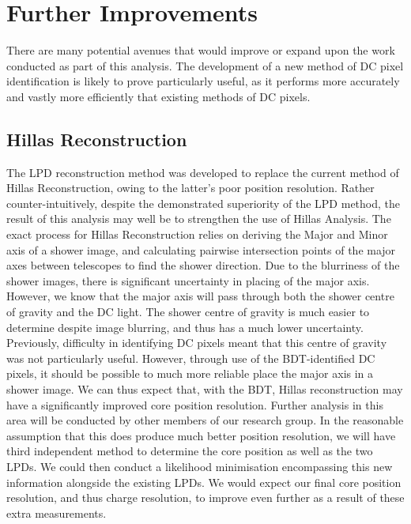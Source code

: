 \documentclass[11pt]{article}
\begin{document}
\section{Further Improvements}
There are many potential avenues that would improve or expand upon the work conducted as part of this analysis. The development of a new method of DC pixel identification is likely to prove particularly useful, as it performs more accurately and vastly more efficiently that existing methods of DC pixels.  

\subsection{Hillas Reconstruction}
The LPD reconstruction method was developed to replace the current method of Hillas Reconstruction, owing to the latter's poor position resolution. Rather counter-intuitively, despite the demonstrated superiority of the LPD method, the result of this analysis may well be to strengthen the use of Hillas Analysis. The exact process for Hillas Reconstruction relies on deriving the Major and Minor axis of a shower image, and calculating pairwise intersection points of the major axes between telescopes to find the shower direction. Due to the blurriness of the shower images, there is significant uncertainty in placing of the major axis. However, we know that the major axis will pass through both the shower centre of gravity and the DC light. The shower centre of gravity is much easier to determine despite image blurring, and thus has a much lower uncertainty. Previously, difficulty in identifying DC pixels meant that this centre of gravity was not particularly useful. However, through use of the BDT-identified DC pixels, it should be possible to much more reliable place the major axis in a shower image. We can thus expect that, with the BDT, Hillas reconstruction may have a significantly improved core position resolution. Further analysis in this area will be conducted by other members of our research group. In the reasonable assumption that this does produce much better position resolution, we will have third independent method to determine the core position as well as the two LPDs. We could then conduct a likelihood minimisation encompassing this new information alongside the existing LPDs. We would expect our final core position resolution, and thus charge resolution, to improve even further as a result of these extra measurements.
\end{document}
